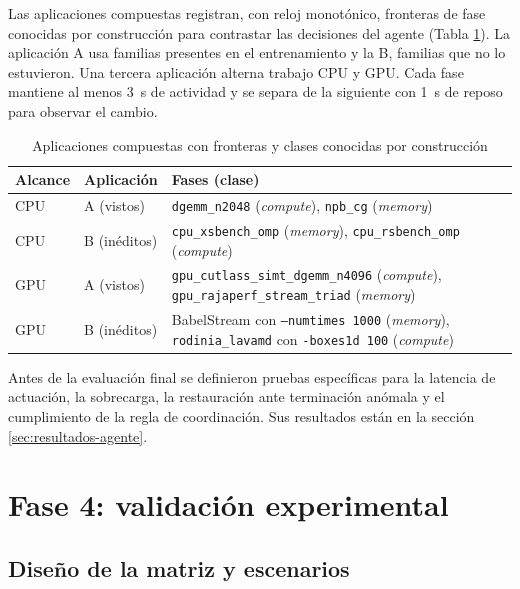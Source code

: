 Las aplicaciones compuestas registran, con reloj monotónico, fronteras de fase conocidas por construcción para contrastar las decisiones del agente (Tabla \ref{tab:agente-compuestas}). La aplicación A usa familias presentes en el entrenamiento y la B, familias que no lo estuvieron. Una tercera aplicación alterna trabajo CPU y GPU. Cada fase mantiene al menos 3~s de actividad y se separa de la siguiente con 1~s de reposo para observar el cambio.

\begin{table}[H]
\centering
\caption{Aplicaciones compuestas con fronteras y clases conocidas por construcción}
\label{tab:agente-compuestas}
\small
\setlength{\tabcolsep}{4pt}
\begin{tabular}{@{}>{\raggedright\arraybackslash}p{1.4cm}>{\raggedright\arraybackslash}p{2.0cm}>{\raggedright\arraybackslash}p{10.2cm}@{}}
\toprule
\textbf{Alcance} & \textbf{Aplicación} & \textbf{Fases (clase)} \\
\midrule
CPU & A (vistos) & \texttt{dgemm\_n2048} (\textit{compute}), \texttt{npb\_cg} (\textit{memory}) \\
CPU & B (inéditos) & \texttt{cpu\_xsbench\_omp} (\textit{memory}), \texttt{cpu\_rsbench\_omp} (\textit{compute}) \\
GPU & A (vistos) & \texttt{gpu\_cutlass\_simt\_dgemm\_n4096} (\textit{compute}), \texttt{gpu\_rajaperf\_stream\_triad} (\textit{memory}) \\
GPU & B (inéditos) & BabelStream con \texttt{--numtimes 1000} (\textit{memory}), \texttt{rodinia\_lavamd} con \texttt{-boxes1d 100} (\textit{compute}) \\
\bottomrule
\end{tabular}
\end{table}

Antes de la evaluación final se definieron pruebas específicas para la latencia de actuación, la sobrecarga, la restauración ante terminación anómala y el cumplimiento de la regla de coordinación. Sus resultados están en la sección \ref{sec:resultados-agente}.

\section{Fase 4: validación experimental}
\label{sec:metodologia-fase4}

\subsection{Diseño de la matriz y escenarios}
\label{sec:metodologia-fase4-matriz}


